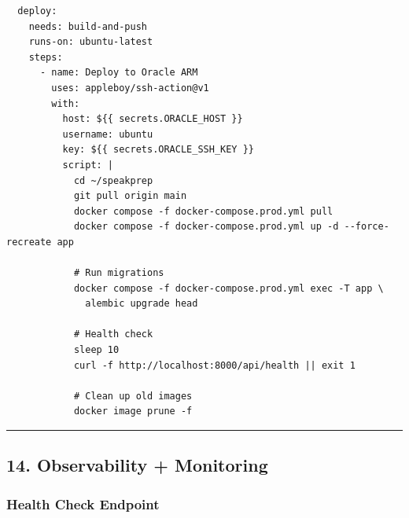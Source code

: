 \documentclass[
  11pt,
]{article}
\begin{document}
\begin{lstlisting}
  deploy:
    needs: build-and-push
    runs-on: ubuntu-latest
    steps:
      - name: Deploy to Oracle ARM
        uses: appleboy/ssh-action@v1
        with:
          host: ${{ secrets.ORACLE_HOST }}
          username: ubuntu
          key: ${{ secrets.ORACLE_SSH_KEY }}
          script: |
            cd ~/speakprep
            git pull origin main
            docker compose -f docker-compose.prod.yml pull
            docker compose -f docker-compose.prod.yml up -d --force-recreate app
            
            # Run migrations
            docker compose -f docker-compose.prod.yml exec -T app \
              alembic upgrade head
            
            # Health check
            sleep 10
            curl -f http://localhost:8000/api/health || exit 1
            
            # Clean up old images
            docker image prune -f
\end{lstlisting}

\begin{center}\rule{0.5\linewidth}{0.5pt}\end{center}

\hypertarget{observability-monitoring}{%
\subsection{14. Observability +
Monitoring}\label{observability-monitoring}}

\hypertarget{health-check-endpoint}{%
\subsubsection{Health Check Endpoint}\label{health-check-endpoint}}
\end{document}

